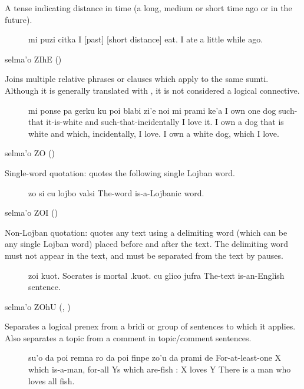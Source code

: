 A tense indicating distance in time (a long, medium or short
    time ago or in the future).
\begin{description}
\item[] mi puzi citka I [past] [short distance] eat. I ate a little while ago.
\end{description}

selma'o ZIhE () 

Joins multiple relative phrases or clauses which apply to
    the same sumti. Although it is generally translated with
    , it is not considered a logical connective.
\begin{description}
\item[] mi ponse pa gerku ku poi blabi zi'e noi mi prami ke'a I own one dog such-that it-is-white and such-that-incidentally I love it. I own a dog that is white and which, incidentally, I love. I own a white dog, which I love.
\end{description}

selma'o ZO () 

Single-word quotation: quotes the following single Lojban
    word.
\begin{description}
\item[] zo si cu lojbo valsi The-word  is-a-Lojbanic word.
\end{description}

selma'o ZOI () 

Non-Lojban quotation: quotes any text using a delimiting
    word (which can be any single Lojban word) placed before and
    after the text. The delimiting word must not appear in the
    text, and must be separated from the text by pauses.
\begin{description}
\item[] zoi kuot. Socrates is mortal .kuot. cu glico jufra The-text  is-an-English sentence.
\end{description}

selma'o ZOhU (, ) 

Separates a logical prenex from a bridi or group of
    sentences to which it applies. Also separates a topic from a
    comment in topic/comment sentences.
\begin{description}
\item[] su'o da poi remna ro da poi finpe zo'u da prami de For-at-least-one X which is-a-man, for-all Ys which are-fish : X loves Y There is a man who loves all fish. 
\end{description}
